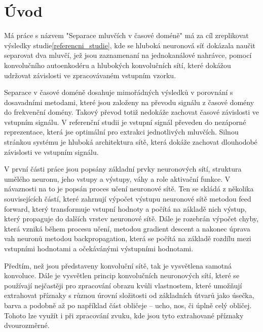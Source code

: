 \chapter{Úvod}


Má práce s názvem "Separace mluvčích v časové doméně" má za cíl zreplikovat výsledky studie\ref{referencni_studie}, kde se hluboká neuronová síť dokázala naučit separovat dva mluvčí, jež jsou zaznamenaní na jednokanálové nahrávce, pomocí konvolučního autoenkodéru a hlubokých konvolučních sítí, které dokážou udržovat závislosti ve zpracovávaném vstupním vzorku.

Separace v časové doméně dosahuje mimořádných výsledků v porovnání s dosavadními metodami, které jsou založeny na převodu signálu z časové domény do frekvenční domény. Takový převod totiž nedokáže zachovat časové závislosti ve vstupním signálu. V referenční studii je vstupní signál převeden do nezáporné reprezentace, která jse optimální pro extrakci jednotlivých mluvčích. Silnou stránkou systému je hluboká architektura sítě, která dokáže zachovat dlouhodobé závislosti ve vstupním signálu.

V první části práce jsou popsány základní prvky neuronových sítí, struktura umělého neuronu, jeho vstupy a výstupy, váhy a role aktivační funkce. V návaznosti na to je popsán proces učení neuronové sítě. Ten se skládá z několika souvisejících částí, které zahrnují výpočet výstupu neuronové sítě metodou feed forward, který transformuje vstupní hodnoty a počítá na základě nich výstup, který propaguje do dalších vrstev neuronové sítě. Dále je rozebrán výpočet chyby, která vzniká během procesu učení, metodou gradient descent a nakonec úprava vah neuronů metodou backpropagation, která se počítá na základě rozdílu mezi vstupními hodnotami a očekávánými výstupními hodnotami.

Předtím, než jsou představeny konvoluční sítě, tak je vysvětlena samotná konvoluce.
Dále je vysvětlen princip konvolučních neuronových sítí, které se používají nejčastěji pro zpracování obrazu kvůli vlastnostem, které umožňují extrahovat příznaky s různou úrovní složitosti od základních útvarů jako úsečka, barva a podobně až po například část obličeje -- ucho, nos, či úplně celý obličej. Tohoto lze využít i při zpracování zvuku, kde jsou tyto extrahované příznaky dvourozměrné.

